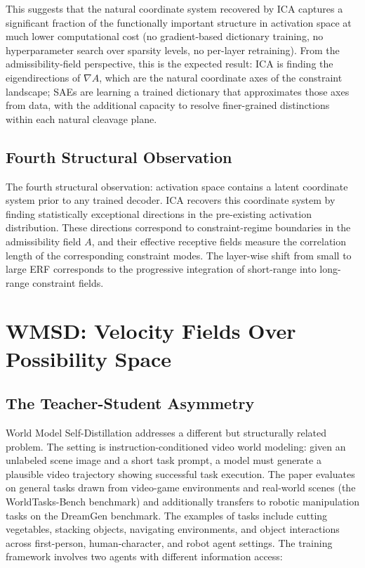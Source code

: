 \documentclass[12pt, a4paper]{article}
\theoremstyle{plain}
\theoremstyle{definition}
\theoremstyle{remark}
\newcommand{\fA}{A}
\begin{document}
This suggests that the natural coordinate system recovered by ICA captures
a significant fraction of the functionally important structure in activation
space at much lower computational cost (no gradient-based dictionary
training, no hyperparameter search over sparsity levels, no per-layer
retraining). From the admissibility-field perspective, this is the expected
result: ICA is finding the eigendirections of $\nabla \fA$, which are the
natural coordinate axes of the constraint landscape; SAEs are learning a
trained dictionary that approximates those axes from data, with the
additional capacity to resolve finer-grained distinctions within each
natural cleavage plane.

\subsection{Fourth Structural Observation}

The fourth structural observation: activation space contains a latent
coordinate system prior to any trained decoder. ICA recovers this coordinate
system by finding statistically exceptional directions in the pre-existing
activation distribution. These directions correspond to constraint-regime
boundaries in the admissibility field $\fA$, and their effective receptive
fields measure the correlation length of the corresponding constraint modes.
The layer-wise shift from small to large ERF corresponds to the progressive
integration of short-range into long-range constraint fields.

\section{WMSD: Velocity Fields Over Possibility Space}

\subsection{The Teacher-Student Asymmetry}

World Model Self-Distillation \cite{stapf2026wmsd} addresses a different but
structurally related problem. The setting is instruction-conditioned video
world modeling: given an unlabeled scene image and a short task prompt, a
model must generate a plausible video trajectory showing successful task
execution. The paper evaluates on general tasks drawn from video-game
environments and real-world scenes (the WorldTasks-Bench benchmark) and
additionally transfers to robotic manipulation tasks on the DreamGen
benchmark. The examples of tasks include cutting vegetables, stacking
objects, navigating environments, and object interactions across
first-person, human-character, and robot agent settings. The training
framework involves two agents with different information access:
\end{document}
